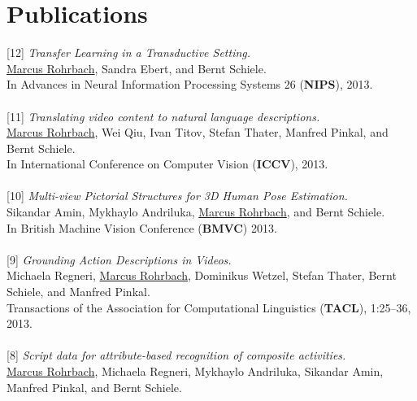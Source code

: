 \pagestyle{empty}
%

\chapter*{\Huge{Publications}}
{[12]} \textit{Transfer Learning in a Transductive Setting.}\\ 
\ul{Marcus Rohrbach}, Sandra Ebert, and Bernt Schiele. \\
In Advances in Neural Information Processing Systems 26 (\textbf{NIPS}), 2013.
\\
\\
{[11]} \textit{Translating video content to natural language descriptions.}\\
\ul{Marcus Rohrbach}, Wei Qiu, Ivan Titov, Stefan Thater, Manfred Pinkal, and Bernt Schiele.\\ 
In International Conference on Computer Vision (\textbf{ICCV}), 2013. 
\\
\\
{[10]} \textit{Multi-view Pictorial Structures for 3D Human Pose Estimation.}\\ 
Sikandar Amin, Mykhaylo Andriluka, \ul{Marcus Rohrbach}, and Bernt Schiele.\\ 
In British Machine Vision Conference (\textbf{BMVC}) 2013.
\\
\\
{[9]} \textit{Grounding Action Descriptions in Videos.} \\
Michaela Regneri, \ul{Marcus Rohrbach}, Dominikus Wetzel, Stefan Thater, Bernt Schiele, and Manfred Pinkal.\\ 
Transactions of the Association for Computational Linguistics (\textbf{TACL}), 1:25--36, 2013.
\\
\\
{[8]} \textit{Script data for attribute-based recognition of composite activities.}\\
\ul{Marcus Rohrbach}, Michaela Regneri, Mykhaylo Andriluka, Sikandar Amin, Manfred Pinkal, and Bernt Schiele.\\
